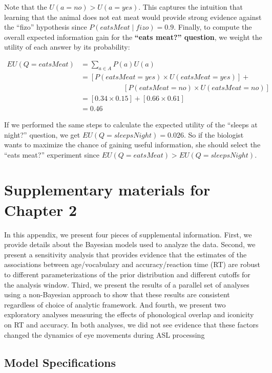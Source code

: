 \documentclass[oneside]{report}
\begin{document}
\noindent
Note that the \(U(a = no) > U(a = yes)\). This captures the intuition
that learning that the animal does not eat meat would provide strong
evidence against the ``fizo'' hypothesis since
\(P(eatsMeat \mid fizo) = 0.9\). Finally, to compute the overall
expected information gain for the \textbf{``eats meat?'' question}, we
weight the utility of each answer by its probability:

\[
\begin{aligned}
EU(Q = eatsMeat) &= \sum_{a\in A}{P(a)U(a)} \\
&= [P(eatsMeat = yes) \times U(eatsMeat = yes)] + \\& \qquad \qquad \qquad [P(eatsMeat = no) \times U(eatsMeat = no)]\\
&= [0.34 \times 0.15] + [0.66 \times 0.61]\\
&= 0.46
\end{aligned}
\]

If we performed the same steps to calculate the expected utility of the
``sleeps at night?'' question, we get \(EU(Q = sleepsNight) = 0.026\).
So if the biologist wants to maximize the chance of gaining useful
information, she should select the ``eats meat?'' experiment since
\(EU(Q = eatsMeat) > EU(Q = sleepsNight)\).

\chapter{Supplementary materials for Chapter
2}\label{supplementary-materials-for-chapter-2}

In this appendix, we present four pieces of supplemental information.
First, we provide details about the Bayesian models used to analyze the
data. Second, we present a sensitivity analysis that provides evidence
that the estimates of the associations between age/vocabulary and
accuracy/reaction time (RT) are robust to different parameterizations of
the prior distribution and different cutoffs for the analysis window.
Third, we present the results of a parallel set of analyses using a
non-Bayesian approach to show that these results are consistent
regardless of choice of analytic framework. And fourth, we present two
exploratory analyses measuring the effects of phonological overlap and
iconicity on RT and accuracy. In both analyses, we did not see evidence
that these factors changed the dynamics of eye movements during ASL
processing

\section{Model Specifications}\label{model-specifications}
\end{document}
